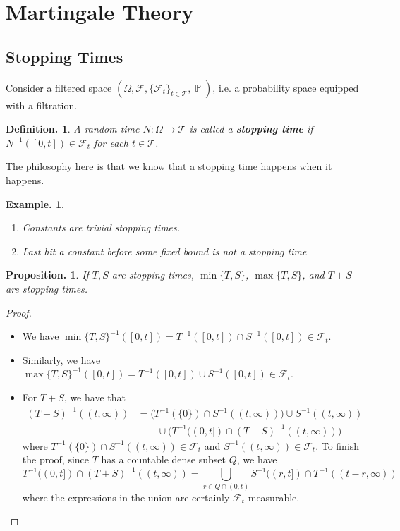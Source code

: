 \documentclass[11pt, a4paper]{memoir}
\newcommand{\agspace}{\ensuremath{\phantom{--}}}
\theoremstyle{change}
\newtheorem{proposition}[theorem]{Proposition.}
\theoremstyle{plain}
\theoremstyle{nonumberplain}
\newtheorem{definition}{Definition.}
\newtheorem{example}{Example.}
\newtheorem{proof}{Proof}
\DeclareMathOperator{\pr}{{\mathbb{P}}}
\newcommand{\defn}[1]{{\boldmath\bfseries #1}}
\numberwithin{equation}{section}
\begin{document}
\section{Martingale Theory}
\subsection{Stopping Times}
Consider a filtered space $(\Omega,\mathcal{F},\{\mathcal{F}_t\}_{t\in \mathcal{T}},\pr)$, i.e. a probability space equipped with a filtration.
\begin{definition}
    A random time $N:\Omega\to \mathcal{T}$ is called a \defn{stopping time} if $N^{-1}([0,t])\in\mathcal{F}_t$ for each $t\in \mathcal{T}$.
\end{definition}
The philosophy here is that we know that a stopping time happens when it happens.
\begin{example}
    \begin{enumerate}[nl,r]
        \item Constants are trivial stopping times.
        \item Last hit a constant before some fixed bound is not a stopping time
    \end{enumerate}
\end{example}
\begin{proposition}
    If $T,S$ are stopping times, $\min\{T,S\}$, $\max\{T,S\}$, and $T+S$ are stopping times.
\end{proposition}
\begin{proof}
    \begin{itemize}[nl]
        \item We have $\min\{T,S\}^{-1}([0,t])=T^{-1}([0,t])\cap S^{-1}([0,t])\in\mathcal{F}_t$.
        \item Similarly, we have $\max\{T,S\}^{-1}([0,t])=T^{-1}([0,t])\cup S^{-1}([0,t])\in\mathcal{F}_t$.
        \item For $T+S$, we have that
            \begin{align*}
                (T+S)^{-1}((t,\infty))&=\bigl(T^{-1}(\{0\})\cap S^{-1}((t,\infty))\bigr)\cup S^{-1}((t,\infty))\\
                                      &\agspace \cup\bigl(T^{-1}((0,t])\cap (T+S)^{-1}((t,\infty))\bigr)
            \end{align*}
            where $T^{-1}(\{0\})\cap S^{-1}((t,\infty))\in\mathcal{F}_t$ and $S^{-1}((t,\infty))\in\mathcal{F}_t$.
            To finish the proof, since $T$ has a countable dense subset $Q$, we have
            \begin{equation*}
                T^{-1}((0,t])\cap (T+S)^{-1}((t,\infty))=\bigcup_{r\in Q\cap(0,t)}S^{-1}((r,t])\cap T^{-1}((t-r,\infty))
            \end{equation*}
            where the expressions in the union are certainly $\mathcal{F}_t$-measurable.
    \end{itemize}
\end{proof}
\end{document}
